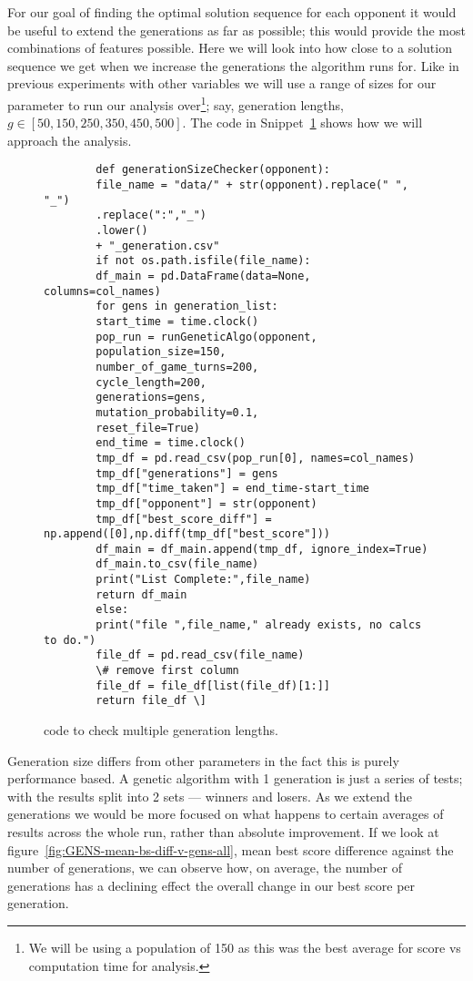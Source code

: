 For our goal of finding the optimal solution sequence for each opponent it would be useful to extend the generations as far as possible;
this would provide the most combinations of features possible.
Here we will look into how close to a solution sequence we get when we increase the generations the algorithm runs for.
Like in previous experiments with other variables we will use a range of sizes for our parameter to run our analysis
over\footnote{We will be using a population of 150 as this was the best average for score vs computation time for analysis.}; say, generation lengths, \(g \in [50,150,250,350,450,500]\).
The code in Snippet~\ref{code:generationChecker} shows how we will approach the analysis.\\

\begin{figure}
    \begin{verbatim}
        def generationSizeChecker(opponent):
        file_name = "data/" + str(opponent).replace(" ", "_")
        .replace(":","_")
        .lower()
        + "_generation.csv"
        if not os.path.isfile(file_name):
        df_main = pd.DataFrame(data=None, columns=col_names)
        for gens in generation_list:
        start_time = time.clock()
        pop_run = runGeneticAlgo(opponent,
        population_size=150,
        number_of_game_turns=200,
        cycle_length=200,
        generations=gens,
        mutation_probability=0.1,
        reset_file=True)
        end_time = time.clock()
        tmp_df = pd.read_csv(pop_run[0], names=col_names)
        tmp_df["generations"] = gens
        tmp_df["time_taken"] = end_time-start_time
        tmp_df["opponent"] = str(opponent)
        tmp_df["best_score_diff"] = np.append([0],np.diff(tmp_df["best_score"]))
        df_main = df_main.append(tmp_df, ignore_index=True)
        df_main.to_csv(file_name)
        print("List Complete:",file_name)
        return df_main
        else:
        print("file ",file_name," already exists, no calcs to do.")
        file_df = pd.read_csv(file_name)
        \# remove first column
        file_df = file_df[list(file_df)[1:]]
        return file_df \]
    \end{verbatim}
    \caption{code to check multiple generation lengths.}\label{code:generationChecker}
\end{figure}

Generation size differs from other parameters in the fact this is purely performance based.
A genetic algorithm with 1 generation is just a series of tests;
with the results split into 2 sets --- winners and losers.
As we extend the generations we would be more focused on what happens to certain averages of results across the whole run, rather than absolute improvement.
If we look at figure~\ref{fig:GENS-mean-bs-diff-v-gens-all}, mean best score difference against the number of generations, we can observe how, on average, the number of generations has a declining effect the overall change in our best score per generation.\\

